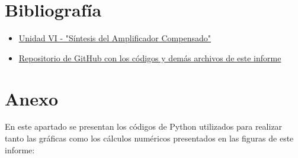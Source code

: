 \documentclass[12pt,a4paper]{article}
\begin{document}
\section{Bibliografía}
\begin{itemize}
    \item \href{https://fcefyn.aulavirtual.unc.edu.ar/pluginfile.php/959870/mod_resource/content/1/SRA-CapVI-VII_2013-Rev1.pdf}{Unidad VI - "Síntesis del Amplificador Compensado"}
    \item \href{https://github.com/ErnestMonja/Sintesis_de_Redes_Activas/tree/main}{Repositorio de GitHub con los códigos y demás archivos de este informe}
\end{itemize}



\section{Anexo}
En este apartado se presentan los códigos de Python utilizados para realizar tanto las gráficas como los cálculos numéricos presentados en las figuras de este informe:
\end{document}

